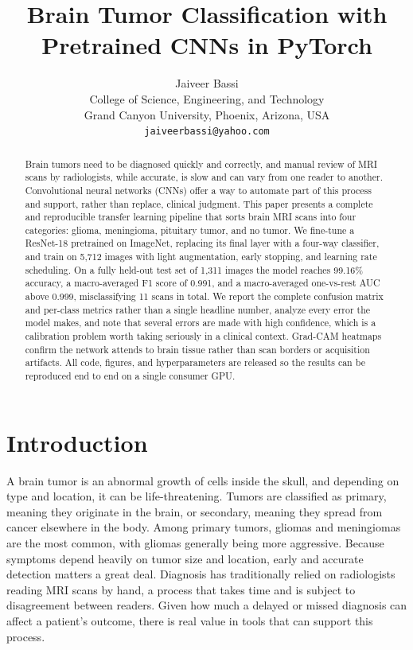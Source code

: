 \documentclass[twocolumn]{article}
\title{\textbf{Brain Tumor Classification with Pretrained CNNs in PyTorch}}
\author{Jaiveer Bassi \\
College of Science, Engineering, and Technology \\
Grand Canyon University, Phoenix, Arizona, USA \\
\texttt{jaiveerbassi@yahoo.com}}
\date{}
\begin{document}
\maketitle

\begin{abstract}
Brain tumors need to be diagnosed quickly and correctly, and manual review of MRI scans by radiologists, while accurate, is slow and can vary from one reader to another. Convolutional neural networks (CNNs) offer a way to automate part of this process and support, rather than replace, clinical judgment. This paper presents a complete and reproducible transfer learning pipeline that sorts brain MRI scans into four categories: glioma, meningioma, pituitary tumor, and no tumor. We fine-tune a ResNet-18 pretrained on ImageNet, replacing its final layer with a four-way classifier, and train on 5,712 images with light augmentation, early stopping, and learning rate scheduling. On a fully held-out test set of 1,311 images the model reaches 99.16\% accuracy, a macro-averaged F1 score of 0.991, and a macro-averaged one-vs-rest AUC above 0.999, misclassifying 11 scans in total. We report the complete confusion matrix and per-class metrics rather than a single headline number, analyze every error the model makes, and note that several errors are made with high confidence, which is a calibration problem worth taking seriously in a clinical context. Grad-CAM heatmaps confirm the network attends to brain tissue rather than scan borders or acquisition artifacts. All code, figures, and hyperparameters are released so the results can be reproduced end to end on a single consumer GPU.
\end{abstract}

\section{Introduction}
A brain tumor is an abnormal growth of cells inside the skull, and depending on type and location, it can be life-threatening. Tumors are classified as primary, meaning they originate in the brain, or secondary, meaning they spread from cancer elsewhere in the body. Among primary tumors, gliomas and meningiomas are the most common, with gliomas generally being more aggressive. Because symptoms depend heavily on tumor size and location, early and accurate detection matters a great deal. Diagnosis has traditionally relied on radiologists reading MRI scans by hand, a process that takes time and is subject to disagreement between readers. Given how much a delayed or missed diagnosis can affect a patient's outcome, there is real value in tools that can support this process.
\end{document}
